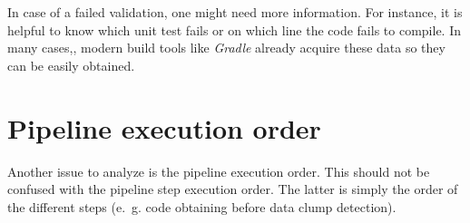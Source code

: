 In case of a failed validation, one might need more information. For instance, it is helpful to know which unit test fails or on which line the code fails to compile. In many cases,, modern build tools like \textit{Gradle} already acquire these data so they can be easily obtained. 
\begin{comment}

\section{Pipeline execution example}
Listing \ref{lst:math_stuff_java} will be used as the foundation to describe a detailed approach for fixing data clumps.

Looking at the parameters \textit{x}, \textit{y}, and \textit{z}, there are multiple suggestions for a class name. The most trivial one is a simple concatenation  (e.g., \textit{XYZ} or \textit{X\_Y\_Z}). However, this name is often not suitable as it can be hard to read and to understand its meaning.

A more suitable approach requires domain knowledge. It is common knowledge that the terms \textit{x}, \textit{y}, and \textit{z} are terms used in math to describe coordinates. Using this information, a fitting name could be \textit{Coordinate}. Simple methods would not have discovered this name as artificial or human intelligence is required. 



Since a suitable class name has been found, the following class can be created using previously obtained information. 

Listing \ref{lst:coordinate_java} shows an example implementation of a coordinate class. This class contains fields, getters, and setters for all method parameters. There is also a constructor for initialization. This respects Fowler's opinion that the extracted class should not be a mere data class but a functional class that can be easily extended and modified.


\end{comment}
\section{Pipeline execution order}

Another issue to analyze is the pipeline execution order. This should not be confused with the pipeline step execution order. The latter is simply the order of the different steps (e.~g. code obtaining before data clump detection). 

